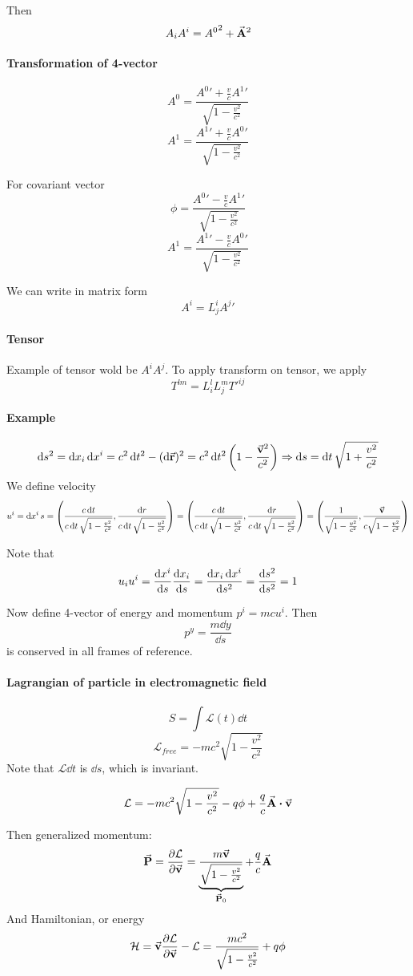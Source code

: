 Then
$$A_iA^i = {A^0}^2 + \va{A}^2$$

\paragraph{Transformation of 4-vector}
$$A^0 = \frac{{A^0}' + \frac{v}{c}{A^1}'}{\sqrt{1-\frac{v^2}{c^2}}}$$
$$A^1 = \frac{{A^1}' + \frac{v}{c}{A^0}'}{\sqrt{1-\frac{v^2}{c^2}}}$$

For covariant vector
$$\phi = \frac{{A^0}' - \frac{v}{c}{A^1}'}{\sqrt{1-\frac{v^2}{c^2}}}$$
$$A^1 = \frac{{A^1}' - \frac{v}{c}{A^0}'}{\sqrt{1-\frac{v^2}{c^2}}}$$

We can write in matrix form
$$A^i = L_j^i {A^j}'$$
\paragraph{Tensor}
Example of tensor wold be $A^iA^j$. To apply transform on tensor, we apply 
$$T^{lm} = L_{i}^l L_j^m {T'}^{ij}$$
\paragraph{Example}
$$\dd{s^2} = \dd{x_i} \dd{x^i} = c^2\dd{t^2} - (\dd{\va{r}})^2 = c^2\dd{t^2} \qty(1-\frac{\va{v}^2}{c^2}) \Rightarrow \dd{s} = \dd{t} \sqrt{1+\frac{v^2}{c^2}}$$
We define velocity
$$u^i = \dd{x^i}{s} = \qty(\frac{c\dd{t}}{c\dd{t}\sqrt{1-\frac{v^2}{c^2}}}, \frac{\dd{r}}{c\dd{t}\sqrt{1-\frac{v^2}{c^2}}}) = \qty(\frac{c\dd{t}}{c\dd{t}\sqrt{1-\frac{v^2}{c^2}}}, \frac{\dd{r}}{c\dd{t}\sqrt{1-\frac{v^2}{c^2}}}) = \qty(\frac{1}{\sqrt{1-\frac{v^2}{c^2}}}, \frac{\va{v}}{c\sqrt{1-\frac{v^2}{c^2}}})$$

Note that
$$u_iu^i = \dv{x^i}{s}\dv{x_i}{s} = \frac{\dd{x_i}\dd{x^i}}{\dd{s^2}}  = \frac{\dd{s^2}}{\dd{s^2}} = 1$$

Now define 4-vector of energy and momentum $p^i = mcu^i$. Then
$$p^y = \frac{m\dd{y}}{\dd{s}}$$
is conserved in all frames of reference.

\paragraph{Lagrangian of particle in electromagnetic field}
$$S =\int \mathcal{L}(t) \dd{t}$$
$$\mathcal{L}_{free} = -mc^2\sqrt{1-\frac{v^2}{c^2}}$$
Note that $\mathcal{L} \dd{t}$ is $\dd{s}$, which is invariant.

$$\mathcal{L} = -mc^2\sqrt{1-\frac{v^2}{c^2}} - q\phi +\frac{q}{c}\va{A} \vdot \va{v}$$

Then generalized momentum:
$$\va{P} = \pdv{\mathcal{L}}{\va{v}} =\underbrace{ \frac{m\va{v}}{\sqrt{1-\frac{v^2}{c^2}}}}_{\va{P}_0} + \frac{q}{c}\va{A}$$
And Hamiltonian, or energy
$$\mathcal{H}= \va{v} \pdv{\mathcal{L}}{\va{v}}  - \mathcal{L} =  \frac{mc^2}{\sqrt{1-\frac{v^2}{c^2}}} + q\phi$$

